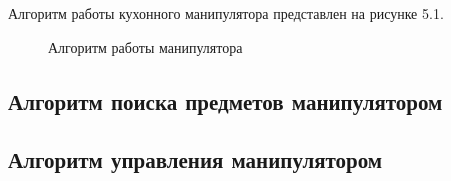 Алгоритм работы кухонного манипулятора представлен на рисунке 5.1.

\begin{figure}[h!]
\caption{Алгоритм работы манипулятора}
\end{figure}

\newpage

\subsection{Алгоритм поиска предметов манипулятором}

\subsection{Алгоритм управления манипулятором}

\newpage